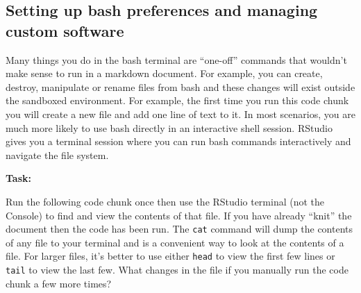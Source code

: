 \documentclass[
]{article}
\newenvironment{Shaded}{\begin{snugshade}}{\end{snugshade}}
\newcommand{\BuiltInTok}[1]{#1}
\newcommand{\CommentTok}[1]{\textcolor[rgb]{0.56,0.35,0.01}{\textit{#1}}}
\newcommand{\FunctionTok}[1]{\textcolor[rgb]{0.00,0.00,0.00}{#1}}
\newcommand{\NormalTok}[1]{#1}
\newcommand{\OperatorTok}[1]{\textcolor[rgb]{0.81,0.36,0.00}{\textbf{#1}}}
\newcommand{\StringTok}[1]{\textcolor[rgb]{0.31,0.60,0.02}{#1}}
\newcommand{\VariableTok}[1]{\textcolor[rgb]{0.00,0.00,0.00}{#1}}
\begin{document}
\hypertarget{setting-up-bash-preferences-and-managing-custom-software}{%
\subsection{Setting up bash preferences and managing custom
software}\label{setting-up-bash-preferences-and-managing-custom-software}}

Many things you do in the bash terminal are ``one-off'' commands that
wouldn't make sense to run in a markdown document. For example, you can
create, destroy, manipulate or rename files from bash and these changes
will exist outside the sandboxed environment. For example, the first
time you run this code chunk you will create a new file and add one line
of text to it. In most scenarios, you are much more likely to use bash
directly in an interactive shell session. RStudio gives you a terminal
session where you can run bash commands interactively and navigate the
file system.

\textbf{Task:}

Run the following code chunk once then use the RStudio terminal (not the
Console) to find and view the contents of that file. If you have already
``knit'' the document then the code has been run. The \texttt{cat}
command will dump the contents of any file to your terminal and is a
convenient way to look at the contents of a file. For larger files, it's
better to use either \texttt{head} to view the first few lines or
\texttt{tail} to view the last few. What changes in the file if you
manually run the code chunk a few more times?

\begin{Shaded}
\end{Shaded}
\end{document}
